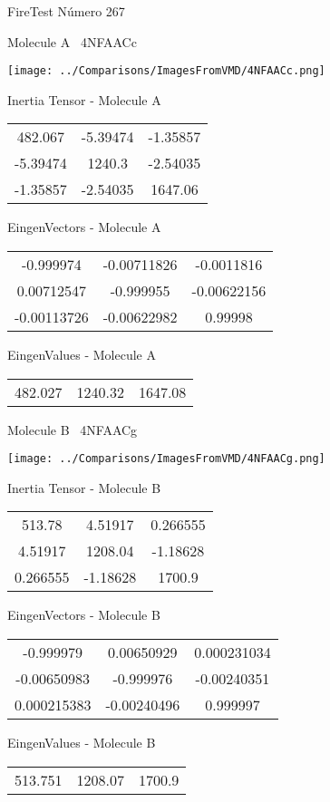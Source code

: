 \vtab[-3cm]
\begin{center}
{\large FireTest \tab Número 267}
\end{center}
\begin{multicols}{2}
\begin{center}

Molecule A \
4NFAACc

\texttt{[image: ../Comparisons/ImagesFromVMD/4NFAACc.png]}

Inertia Tensor - Molecule A \\
\begin{tabular}{|c c c|}
482.067	 & 	-5.39474	 & 	-1.35857	 \\
-5.39474	 & 	1240.3	 & 	-2.54035	 \\
-1.35857	 & 	-2.54035	 & 	1647.06
\end{tabular}

\vtab
 EingenVectors - Molecule A     \\
\begin{tabular}{|c c c|}
-0.999974	 & 	-0.00711826	 & 	-0.0011816	 \\
0.00712547	 & 	-0.999955	 & 	-0.00622156	 \\
-0.00113726	 & 	-0.00622982	 & 	0.99998
\end{tabular}

\vtab
 EingenValues - Molecule A     \\
\begin{tabular}{|c c c|}
482.027	 & 	1240.32	 & 	1647.08	 \\
\end{tabular}
\columnbreak

Molecule B \
4NFAACg

\texttt{[image: ../Comparisons/ImagesFromVMD/4NFAACg.png]}

Inertia Tensor - Molecule B \\
\begin{tabular}{|c c c|}
513.78	 & 	4.51917	 & 	0.266555	 \\
4.51917	 & 	1208.04	 & 	-1.18628	 \\
0.266555	 & 	-1.18628	 & 	1700.9
\end{tabular}

\vtab
 EingenVectors - Molecule B     \\
\begin{tabular}{|c c c|}
-0.999979	 & 	0.00650929	 & 	0.000231034	 \\
-0.00650983	 & 	-0.999976	 & 	-0.00240351	 \\
0.000215383	 & 	-0.00240496	 & 	0.999997
\end{tabular}

\vtab
 EingenValues - Molecule B     \\
\begin{tabular}{|c c c|}
513.751	 & 	1208.07	 & 	1700.9	 \\
\end{tabular}

\end{center}
\end{multicols}

